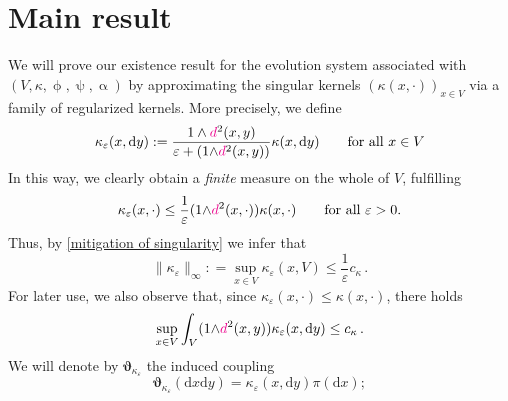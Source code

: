 \documentclass[11pt,reqno]{amsart}
\numberwithin{equation}{section}
\newcommand{\eps}{\varepsilon}
\newcommand{\dd}{\mathrm{d}}
\theoremstyle{definition}
\newcommand{\ep}{\varepsilon}
\let\eps\ep
\def\dd{\mathrm{d}}
\newcommand{\teta}{\boldsymbol \vartheta}
\newcommand{\tetapie}{\boldsymbol{\teta}_{\kappa_\eps}}
\newcommand{\TODO}[1]{\todo[inline, color=cyan!20]{#1}}
\newcommand{\dpi}{{\color{magenta} d}}
\numberwithin{equation}{section}
\begin{document}
\section{Main result}
\label{s:4}
We will prove our existence result for the evolution system associated with $(V,\kappa,\upphi,\uppsi,\upalpha)$ by approximating the singular
kernels $(\kappa(x,\cdot))_{x\in V}$ via a family of regularized kernels.
More precisely, we define 
\begin{equation}
\label{kappa-eps-reg}
	\kappa_\varepsilon(x,\dd y) := \frac{1\wedge\dpi^2(x,y)}{\varepsilon + (1{\wedge}\dpi^2(x,y))} \kappa(x,\dd y) \qquad \text{for all } x \in V
\end{equation}
 In this way, we clearly obtain a \emph{finite} measure on the whole of $V$, fulfilling  
\begin{equation}
\label{crucial-bound-kappaeps}
\kappa_\varepsilon(x,\cdot) \le \frac1\eps (1{\wedge}\dpi^2(x,\cdot)) \kappa(x,\cdot) \qquad \text{for all } \eps>0.
\end{equation}
Thus, by 
\eqref{mitigation of singularity} we infer that 
\begin{equation}
\label{back-2-bounded-kernel}
\|\kappa_\eps\|_\infty : = \sup_{x \in V} \kappa_\eps(x,V) \leq \frac1\eps c_\kappa\,.
\end{equation}
For later use, we also observe that,  since $\kappa_\eps (x, \cdot) \leq \kappa (x,\cdot)$, there holds
\begin{equation}
\label{mitigated-bound}
\sup_{x\in V} \int_{V}  (1{\wedge}\dpi^2(x,y)) \kappa_\eps(x,\dd y) \leq c_\kappa\,.
\end{equation}
We will denote by $\tetapie$ the induced coupling 
\begin{equation}
\label{tetapie}
\tetapie (\dd x \dd y) =\kappa_\eps(x, \dd y  ) \pi (\dd x );
\end{equation}
\end{document}
